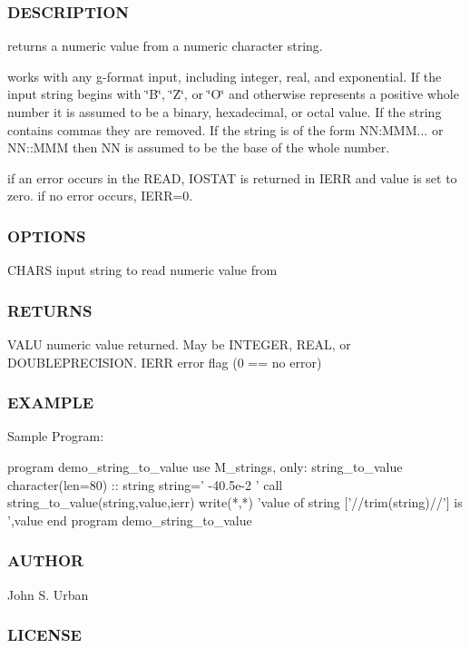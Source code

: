  \subsubsection*{D\+E\+S\+C\+R\+I\+P\+T\+I\+ON}

returns a numeric value from a numeric character string.

works with any g-\/format input, including integer, real, and exponential. If the input string begins with \char`\"{}\+B\char`\"{}, \char`\"{}\+Z\char`\"{}, or \char`\"{}\+O\char`\"{} and otherwise represents a positive whole number it is assumed to be a binary, hexadecimal, or octal value. If the string contains commas they are removed. If the string is of the form NN\+:M\+MM... or N\+N\+::\+M\+MM then NN is assumed to be the base of the whole number.

if an error occurs in the R\+E\+AD, I\+O\+S\+T\+AT is returned in I\+E\+RR and value is set to zero. if no error occurs, I\+E\+RR=0. \subsubsection*{O\+P\+T\+I\+O\+NS}

C\+H\+A\+RS input string to read numeric value from \subsubsection*{R\+E\+T\+U\+R\+NS}

V\+A\+LU numeric value returned. May be I\+N\+T\+E\+G\+ER, R\+E\+AL, or D\+O\+U\+B\+L\+E\+P\+R\+E\+C\+I\+S\+I\+ON. I\+E\+RR error flag (0 == no error) \subsubsection*{E\+X\+A\+M\+P\+LE}

\begin{DoxyVerb}Sample Program:

 program demo_string_to_value
 use M_strings, only: string_to_value
 character(len=80) :: string
    string=' -40.5e-2 '
    call string_to_value(string,value,ierr)
    write(*,*) 'value of string ['//trim(string)//'] is ',value
 end program demo_string_to_value
\end{DoxyVerb}
 \subsubsection*{A\+U\+T\+H\+OR}

John S. Urban \subsubsection*{L\+I\+C\+E\+N\+SE}


